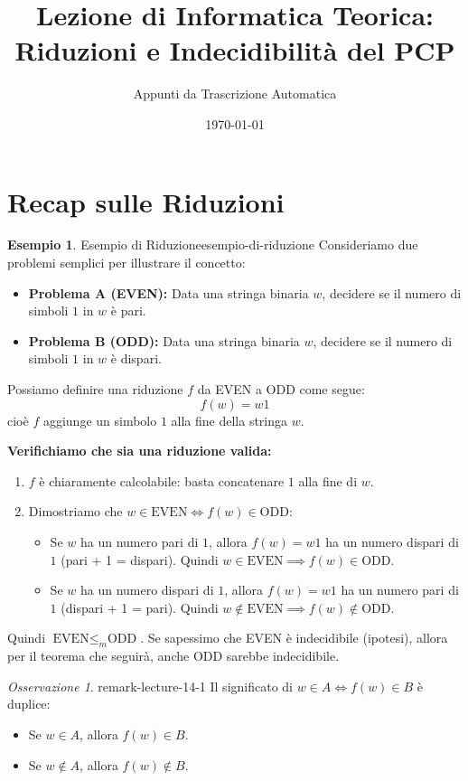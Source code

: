 \documentclass[a4paper]{article}
\title{Lezione di Informatica Teorica: Riduzioni e Indecidibilità del PCP}
\author{Appunti da Trascrizione Automatica}
\date{\today}
\theoremstyle{definition} %
\newtheorem{example}{Esempio}
\theoremstyle{remark} %
\newtheorem{remark}{Osservazione}
\begin{document}
\maketitle
\tableofcontents
\newpage

\section{Recap sulle Riduzioni}

\begin{example}{Esempio di Riduzione}{esempio-di-riduzione}
Consideriamo due problemi semplici per illustrare il concetto:
\begin{itemize}
    \item \textbf{Problema A (EVEN):} Data una stringa binaria $w$, decidere se il numero di simboli $1$ in $w$ è pari.
    \item \textbf{Problema B (ODD):} Data una stringa binaria $w$, decidere se il numero di simboli $1$ in $w$ è dispari.
\end{itemize}

Possiamo definire una riduzione $f$ da EVEN a ODD come segue:
$$f(w) = w1$$
cioè $f$ aggiunge un simbolo $1$ alla fine della stringa $w$.

\textbf{Verifichiamo che sia una riduzione valida:}
\begin{enumerate}
    \item $f$ è chiaramente calcolabile: basta concatenare $1$ alla fine di $w$.
    \item Dimostriamo che $w \in \text{EVEN} \iff f(w) \in \text{ODD}$:
    \begin{itemize}
        \item Se $w$ ha un numero pari di $1$, allora $f(w) = w1$ ha un numero dispari di $1$ (pari + 1 = dispari). Quindi $w \in \text{EVEN} \implies f(w) \in \text{ODD}$.
        \item Se $w$ ha un numero dispari di $1$, allora $f(w) = w1$ ha un numero pari di $1$ (dispari + 1 = pari). Quindi $w \notin \text{EVEN} \implies f(w) \notin \text{ODD}$.
    \end{itemize}
\end{enumerate}

Quindi $\text{EVEN} \le_m \text{ODD}$. Se sapessimo che EVEN è indecidibile (ipotesi), allora per il teorema che seguirà, anche ODD sarebbe indecidibile.
\end{example}

\begin{remark}{}{{ remark-lecture-14-1 }}
Il significato di $w \in A \iff f(w) \in B$ è duplice:
\begin{itemize}
    \item Se $w \in A$, allora $f(w) \in B$.
    \item Se $w \notin A$, allora $f(w) \notin B$.
\end{itemize}
\end{remark}
\end{document}

